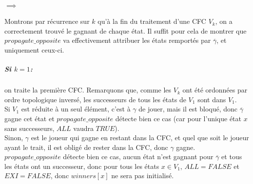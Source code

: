 \documentclass[10pt,a4paper]{article}
\begin{document}
\paragraph{$\implies$}
Montrons par récurrence sur $k$ qu'à la fin du traitement d'une CFC $V_k$, on a correctement trouvé le gagnant de chaque état. Il suffit pour cela de montrer que $propagate\_opposite$ va effectivement attribuer les états remportés par $\overline{\gamma}$, et uniquement ceux-ci.
\subparagraph{Si $k = 1$:} on traite la première CFC. Remarquons que, comme les $V_k$ ont été ordonnées par ordre topologique inversé, les successeurs de tous les états de $V_1$  sont dans $V_1$.\\
Si $V_1$ est réduite à un seul élément, c'est à $\gamma$ de jouer, mais il est bloqué, donc $\overline{\gamma}$ gagne cet état et $propagate\_opposite$ détecte bien ce cas (car pour l'unique état $x$ sans successeurs, $ALL$ vaudra $TRUE$).\\
Sinon, $\gamma$ est le joueur qui gagne en restant dans la CFC, et quel que soit le joueur ayant le trait, il est obligé de rester dans la CFC, donc $\gamma$ gagne. $propagate\_opposite$ détecte bien ce cas, aucun état n'est gagnant pour $\overline{\gamma}$ et tous les états ont un successeur, donc pour tous les états $x \in V_1$, $ALL = FALSE$ et $EXI = FALSE$, donc $winners[x]$ ne sera pas initialisé.
\end{document}
